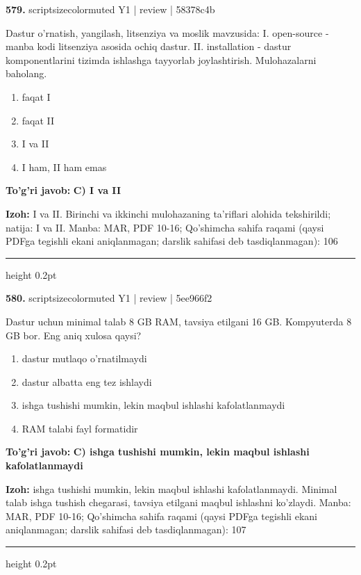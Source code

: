\documentclass[10pt,a4paper]{article}
\begin{document}
{\bfseries\sffamily\color{ink} 579.} {scriptsizecolor{muted} Y1 | review | 58378c4b}
\par
Dastur o'rnatish, yangilash, litsenziya va moslik mavzusida: I. open-source - manba kodi litsenziya asosida ochiq dastur. II. installation - dastur komponentlarini tizimda ishlashga tayyorlab joylashtirish. Mulohazalarni baholang.
\begin{enumerate}[label=\Alph*),leftmargin=9mm]
\item faqat I
\item faqat II
\item I va II
\item I ham, II ham emas
\end{enumerate}
\begin{tcolorbox}[enhanced,breakable,colback=teal!4,colframe=teal!60!black,boxrule=0.45pt,arc=1.2mm,left=2.7mm,right=2.7mm,top=1.8mm,bottom=1.8mm,before skip=2mm,after skip=2mm]
{\bfseries\sffamily\color{teal}To'g'ri javob:} \textbf{C) I va II}
\par\smallskip
{\bfseries Izoh:} I va II. Birinchi va ikkinchi mulohazaning ta'riflari alohida tekshirildi; natija: I va II. Manba: MAR, PDF 10-16; Qo'shimcha sahifa raqami (qaysi PDFga tegishli ekani aniqlanmagan; darslik sahifasi deb tasdiqlanmagan): 106
\end{tcolorbox}
\vspace{2mm}\hrule height 0.2pt\vspace{3mm}

{\bfseries\sffamily\color{ink} 580.} {scriptsizecolor{muted} Y1 | review | 5ee966f2}
\par
Dastur uchun minimal talab 8 GB RAM, tavsiya etilgani 16 GB. Kompyuterda 8 GB bor. Eng aniq xulosa qaysi?
\begin{enumerate}[label=\Alph*),leftmargin=9mm]
\item dastur mutlaqo o'rnatilmaydi
\item dastur albatta eng tez ishlaydi
\item ishga tushishi mumkin, lekin maqbul ishlashi kafolatlanmaydi
\item RAM talabi fayl formatidir
\end{enumerate}
\begin{tcolorbox}[enhanced,breakable,colback=teal!4,colframe=teal!60!black,boxrule=0.45pt,arc=1.2mm,left=2.7mm,right=2.7mm,top=1.8mm,bottom=1.8mm,before skip=2mm,after skip=2mm]
{\bfseries\sffamily\color{teal}To'g'ri javob:} \textbf{C) ishga tushishi mumkin, lekin maqbul ishlashi kafolatlanmaydi}
\par\smallskip
{\bfseries Izoh:} ishga tushishi mumkin, lekin maqbul ishlashi kafolatlanmaydi. Minimal talab ishga tushish chegarasi, tavsiya etilgani maqbul ishlashni ko'zlaydi. Manba: MAR, PDF 10-16; Qo'shimcha sahifa raqami (qaysi PDFga tegishli ekani aniqlanmagan; darslik sahifasi deb tasdiqlanmagan): 107
\end{tcolorbox}
\vspace{2mm}\hrule height 0.2pt\vspace{3mm}
\end{document}
